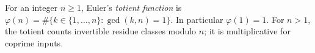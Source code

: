 
For an integer $n\ge1$, Euler's \emph{totient function} is $\varphi(n)=\#\{k\in\{1,\ldots,n\}:\gcd(k,n)=1\}$. In particular $\varphi(1)=1$. For $n>1$, the totient counts invertible residue classes modulo $n$; it is multiplicative for coprime inputs.
